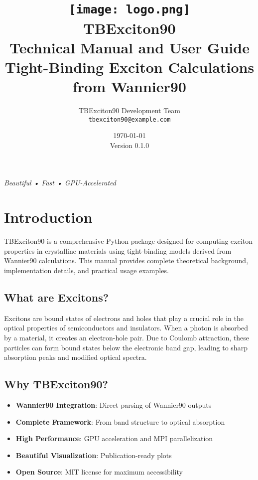 \documentclass[11pt,a4paper]{article}
\title{
    \vspace{-2cm}
    \texttt{[image: logo.png]}\\[1cm]
    {\Huge \textbf{TBExciton90}}\\[0.5cm]
    {\Large Technical Manual and User Guide}\\[0.3cm]
    {\large Tight-Binding Exciton Calculations from Wannier90}
}
\author{
    TBExciton90 Development Team\\
    \texttt{tbexciton90@example.com}
}
\date{\today \\ Version 0.1.0}
\begin{document}
\maketitle
\thispagestyle{empty}

\vfill
\begin{center}
\textit{Beautiful • Fast • GPU-Accelerated}
\end{center}

\newpage

\tableofcontents
\newpage

\section{Introduction}

TBExciton90 is a comprehensive Python package designed for computing exciton properties in crystalline materials using tight-binding models derived from Wannier90 calculations. This manual provides complete theoretical background, implementation details, and practical usage examples.

\subsection{What are Excitons?}

Excitons are bound states of electrons and holes that play a crucial role in the optical properties of semiconductors and insulators. When a photon is absorbed by a material, it creates an electron-hole pair. Due to Coulomb attraction, these particles can form bound states below the electronic band gap, leading to sharp absorption peaks and modified optical spectra.

\subsection{Why TBExciton90?}

\begin{itemize}
    \item \textbf{Wannier90 Integration}: Direct parsing of Wannier90 outputs
    \item \textbf{Complete Framework}: From band structure to optical absorption
    \item \textbf{High Performance}: GPU acceleration and MPI parallelization
    \item \textbf{Beautiful Visualization}: Publication-ready plots
    \item \textbf{Open Source}: MIT license for maximum accessibility
\end{itemize}
\end{document}
